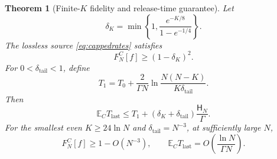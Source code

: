 \documentclass[11pt,a4paper]{article}
\newtheorem{theorem}{Theorem}
\newcommand{\E}{\mathbb E}
\newcommand{\HH}{\mathsf H}
\begin{document}
\begin{theorem}[Finite-\(K\) fidelity and release-time guarantee]
Let
\begin{equation}
 \delta_K=\min\left\{1,\frac{e^{-K/8}}{1-e^{-1/4}}\right\}.
 \label{eq:deltak}
\end{equation}
The lossless source \eqref{eq:cappedrates} satisfies
\begin{equation}
 F_N^C[f]\ge(1-\delta_K)^2.
 \label{eq:cappedfidelity}
\end{equation}
For \(0<\delta_{\mathrm{tail}}<1\), define
\begin{equation}
 T_1=T_0+\frac2{\Gamma N}
 \ln\frac{N(N-K)}{K\delta_{\mathrm{tail}}}.
 \label{eq:T1}
\end{equation}
Then
\begin{equation}
 \E_C T_{\mathrm{last}}
 \le T_1+(\delta_K+\delta_{\mathrm{tail}})\frac{\HH_N}{\Gamma}.
 \label{eq:cappedtime}
\end{equation}
For the smallest even \(K\ge24\ln N\) and
\(\delta_{\mathrm{tail}}=N^{-3}\), at sufficiently large \(N\),
\begin{equation}
 F_N^C[f]\ge1-O(N^{-3}),\qquad
 \E_C T_{\mathrm{last}}
 =O\!\left(\frac{\ln N}{\Gamma N}\right).
 \label{eq:cappedasymptotic}
\end{equation}
\end{theorem}
\end{document}
